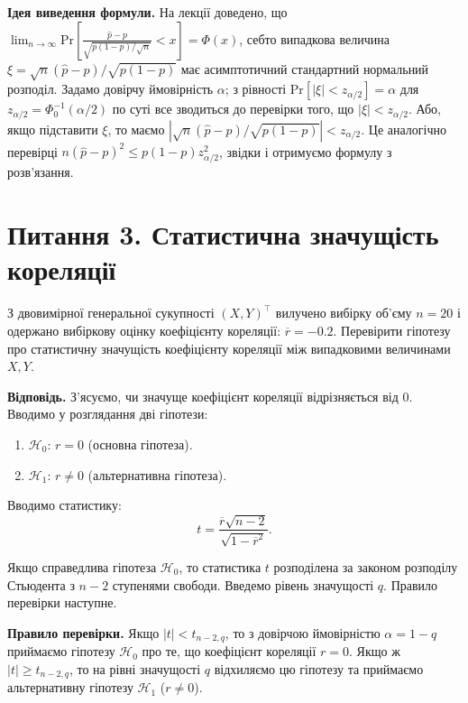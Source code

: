 \documentclass{../hw_template}
\begin{document}
\textbf{Ідея виведення формули.} На лекції доведено, що $\lim_{n \to \infty}
\text{Pr}\left[\frac{\hat{p}-p}{\sqrt{p(1-p)/\sqrt{n}}} < x\right] = \Phi(x)$,
себто випадкова величина $\xi = \sqrt{n}(\hat{p} - p)/\sqrt{p(1-p)}$ має
асимптотичний стандартний нормальний розподіл. Задамо довірчу ймовірність
$\alpha$; з рівності $\text{Pr}[|\xi| < z_{\alpha/2}] = \alpha$ для
$z_{\alpha/2} = \Phi_0^{-1}(\alpha/2)$ по суті все зводиться до перевірки того,
що $|\xi| < z_{\alpha/2}$. Або, якщо підставити $\xi$, то маємо $|\sqrt{n}(\hat{p} - p)/\sqrt{p(1-p)}| <
z_{\alpha/2}$. Це аналогічно перевірці $n(\hat{p}-p)^2 \leq
p(1-p)z_{\alpha/2}^2$, звідки і отримуємо формулу з розв'язання.

\newpage

\section{Питання 3. Статистична значущість кореляції}

\begin{problems}
    З двовимірної генеральної сукупності $(X,Y)^{\top}$ вилучено вибірку об’єму
$n=20$ і одержано вибіркову оцінку коефіцієнту кореляції: $\overline{r} = -0.2$.
Перевірити гіпотезу про статистичну значущість коефіцієнту кореляції між
випадковими величинами $X,Y$. 
\end{problems}

\textbf{Відповідь.} З'ясуємо, чи значуще коефіцієнт кореляції відрізняється від $0$. 
Вводимо у розглядання дві гіпотези:
\begin{enumerate}
    \item $\mathcal{H}_0$: $r = 0$ (основна гіпотеза).
    \item $\mathcal{H}_1$: $r \neq 0$ (альтернативна гіпотеза).
\end{enumerate}

Вводимо статистику:
\begin{equation*}
    t = \frac{\overline{r}\sqrt{n-2}}{\sqrt{1-\overline{r}^2}}.
\end{equation*}

Якщо справедлива гіпотеза $\mathcal{H}_0$, то статистика $t$ розподілена за законом 
розподілу Стьюдента з $n-2$ ступенями свободи. Введемо рівень значущості $q$. Правило 
перевірки наступне.

\textbf{Правило перевірки.} Якщо $|t| < t_{n-2,q}$, то з довірчою ймовірністю 
$\alpha=1-q$ приймаємо гіпотезу $\mathcal{H}_0$ про те, що коефіцієнт кореляції $r=0$.
Якщо ж $|t| \geq t_{n-2,q}$, то на рівні значущості $q$ відхиляємо цю гіпотезу та
приймаємо альтернативну гіпотезу $\mathcal{H}_1$ ($r \neq 0$).
\end{document}
